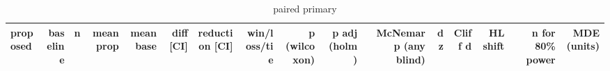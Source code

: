 \begin{table}[t]\centering\small
\begin{tabular}{lrrrrrrrrrrrrrrr}\toprule
proposed & baseline & n & mean prop & mean base & diff [CI] & reduction [CI] & win/loss/tie & p (wilcoxon) & p adj (holm) & McNemar p (any blind) & dz & Cliff d & HL shift & n for 80\% power & MDE (units) \\\midrule

\bottomrule\end{tabular}\caption{paired primary}\end{table}
